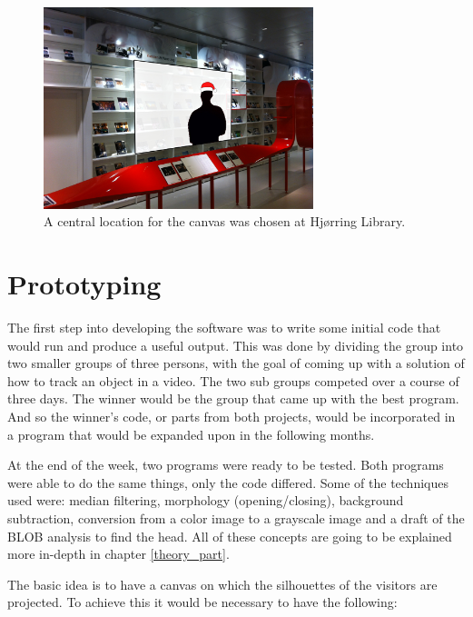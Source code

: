 \begin{figure}[htbp]
\centering
\includegraphics[width=0.7\textwidth]{Pictures/HjoerringLibrary/LocationJohannesHat.jpg}
\caption{A central location for the canvas was chosen at Hj{\o}rring Library.}
\label{fig:concept_art}
\end{figure}


\section{Prototyping}
The first step into developing the software was to write some initial code that would run and produce a useful output. This was done by dividing the group into two smaller groups of three persons, with the goal of coming up with a solution of how to track an object in a video. The two sub groups competed over a course of three days. The winner would be the group that came up with the best program. And so the winner's code, or parts from both projects, would be incorporated in a program that would be expanded upon in the following months.

At the end of the week, two programs were ready to be tested. Both programs were able to do the same things, only the code differed. Some of the techniques used were: median filtering, morphology (opening/closing), background subtraction, conversion from a color image to a grayscale image and a draft of the BLOB analysis to find the head. All of these concepts are going to be explained more in-depth in chapter \ref{theory_part}.

The basic idea is to have a canvas on which the silhouettes of the visitors are projected. To achieve this it would be necessary to have the following:

